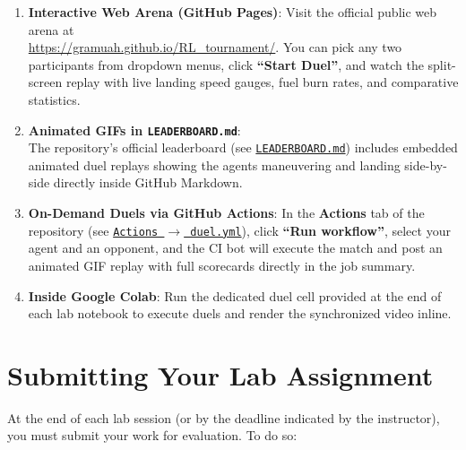 \documentclass[11pt,a4paper]{article}
\begin{document}
\begin{enumerate}
    \item \textbf{Interactive Web Arena (GitHub Pages)}: Visit the official public web arena at \\ \url{https://gramuah.github.io/RL_tournament/}. You can pick any two participants from dropdown menus, click \textbf{``Start Duel''}, and watch the split-screen replay with live landing speed gauges, fuel burn rates, and comparative statistics.
    \item \textbf{Animated GIFs in \texttt{LEADERBOARD.md}}:\\ The repository's official leaderboard (see \href{https://github.com/gramuah/RL_tournament/blob/main/LEADERBOARD.md}{\texttt{LEADERBOARD.md}}) includes embedded animated duel replays showing the agents maneuvering and landing side-by-side directly inside GitHub Markdown.
    \item \textbf{On-Demand Duels via GitHub Actions}: In the \textbf{Actions} tab of the repository (see \href{https://github.com/gramuah/RL_tournament/actions/workflows/duel.yml}{\texttt{Actions $\rightarrow$ duel.yml}}), click \textbf{``Run workflow''}, select your agent and an opponent, and the CI bot will execute the match and post an animated GIF replay with full scorecards directly in the job summary.
    \item \textbf{Inside Google Colab}: Run the dedicated duel cell provided at the end of each lab notebook to execute duels and render the synchronized video inline.
\end{enumerate}

\section{Submitting Your Lab Assignment}
\label{sec:submitting}

At the end of each lab session (or by the deadline indicated by the instructor), you must submit your work for evaluation. To do so:
\end{document}
